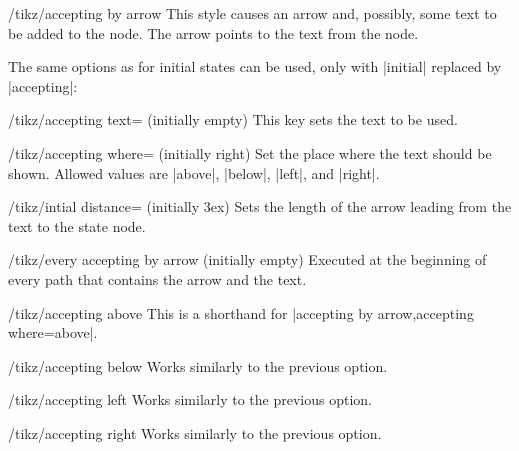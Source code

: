 \begin{stylekey}{/tikz/accepting by arrow}
  This style causes an arrow and, possibly, some text to be added to
  the node. The arrow points to the text from the node.

  The same options as for initial states can be used, only with
  |initial| replaced by |accepting|:
  \begin{key}{/tikz/accepting text= (initially \normalfont empty)}
    This key sets the text to be used.
  \end{key}
  \begin{key}{/tikz/accepting where= (initially right)}
    Set the place where the text should be shown. Allowed values are
    |above|, |below|, |left|, and |right|.
  \end{key}
  \begin{key}{/tikz/intial distance= (initially 3ex)}
    Sets the length of the arrow leading from the text to the state
    node.
  \end{key}
  \begin{stylekey}{/tikz/every accepting by arrow (initially \normalfont empty)}
    Executed at the beginning of every path that contains
    the arrow and the text.
  \end{stylekey}
\begin{codeexample}[]
\end{codeexample}
\end{stylekey}

\begin{stylekey}{/tikz/accepting above}
  This is a shorthand for |accepting by arrow,accepting where=above|.
\end{stylekey}
\begin{stylekey}{/tikz/accepting below}
  Works similarly to the previous option.
\end{stylekey}
\begin{stylekey}{/tikz/accepting left}
  Works similarly to the previous option.
\end{stylekey}
\begin{stylekey}{/tikz/accepting right}
  Works similarly to the previous option.
\end{stylekey}



